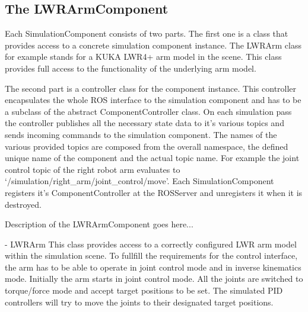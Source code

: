 \subsection{The LWRArmComponent}

Each SimulationComponent consists of two parts. The first  one is a class that provides access to a concrete simulation component instance. The LWRArm class for example stands for a KUKA LWR4+ arm model in the scene. This class provides full access to the functionality of the underlying arm model.

The second part is a controller class for the component instance. This controller encapsulates the whole ROS interface to the simulation component and has to be a subclass of the abstract  ComponentController class. On each simulation pass the controller publishes all the necessary state data to it's various topics and sends incoming commands to the simulation component. The names of the various provided topics are composed from the overall namespace, the defined unique name of the component and the actual topic name. For example the joint control topic of the right robot arm evaluates to `/simulation/right\_arm/joint\_control/move'. Each SimulationComponent registers it's ComponentController at the ROSServer and unregisters it when it is destroyed.

Description of the LWRArmComponent goes here...

- LWRArm
  This class provides access to a correctly configured LWR arm model within the simulation scene.
  To fullfill the requirements for the control interface, the arm has to be able to operate in joint
  control mode and in inverse kinematics mode. Initially the arm starts in joint control mode. All 
  the joints are switched to torque/force mode and accept target positions to be set. The simulated
  PID controllers will try to move the joints to their designated target positions. 
  
